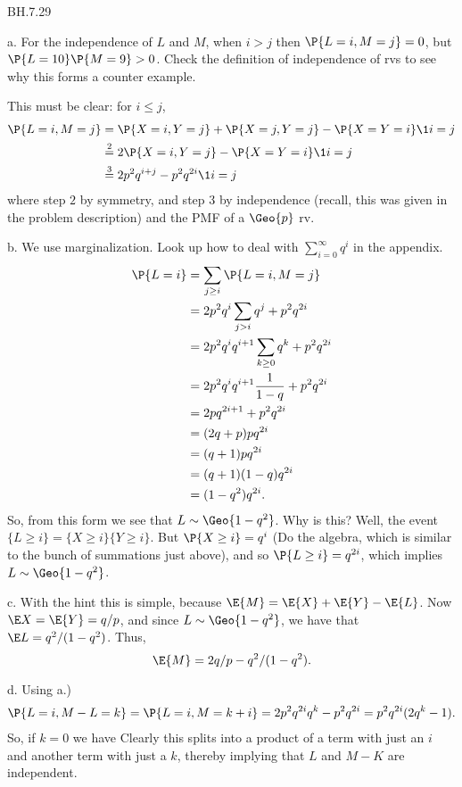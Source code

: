 
\setcounter{theorem}{28}
\begin{exercise} BH.7.29
\begin{solution}
a. For the independence of $L$ and $M$, when $i>j$ then $\P{L=i, M=j}=0$, but $\P{L=10}\P{M=9} > 0$. Check the definition of independence of rvs to see why this forms a counter example.

This must be clear: for $i\leq j$,
\begin{align*}
\P{L=i, M=j}
  &= \P{X=i, Y=j} + \P{X=j, Y=j} - \P{X=Y=i}\1{i=j}\\
  &\stackrel{2}{=} 2\P{X=i, Y=j} - \P{X=Y=i} \1{i=j} \\
  &\stackrel{3}{=} 2 p^{2} q^{i+j} - p^{2}q^{2i}\1{i=j}\\
\end{align*}
where step $2$ by symmetry, and step 3 by independence (recall, this was given in the problem description) and the PMF of a $\Geo{p}$ rv.

b. We use marginalization. Look up how to deal with $\sum_{i=0}^{\infty} q^{i}$ in the appendix.
\begin{align*}
  \P{L=i}
  &= \sum_{j\geq i} \P{L=i, M=j} \\
  &= 2p^2q^i\sum_{j> i} q^j + p^2q^{2i} \\
  &= 2p^2q^i q^{i+1}\sum_{k\geq 0} q^k + p^2q^{2i} \\
  &= 2p^2q^i q^{i+1}\frac{1}{1-q} + p^2q^{2i} \\
  &= 2p q^{2i+1} + p^2q^{2i} \\
  &= (2 q + p)pq^{2i} \\
  &= (q + 1)pq^{2i} \\
  &= (q + 1)(1-q)q^{2i} \\
  &= (1-q^{2})q^{2i}.
\end{align*}
So, from this form we see that $L\sim\Geo{1-q^{2}}$. Why is this? Well, the event $\{L\geq i\} = \{X\geq i\}\{Y\geq i\}$. But $\P{X\geq i} = q^{i}$ (Do the algebra, which is similar to the bunch of summations just above), and so $\P{L\geq i} = q^{2i}$, which implies $L\sim \Geo{1-q^{2}}$.

c. With the hint this is simple, because $\E{M} = \E{X}+\E{Y}- \E{L}$. Now $\E X = \E{Y} = q/p$, and since $L\sim \Geo{1-q^2}$, we have that $\E L = q^2/(1-q^{2})$. Thus,
\begin{equation*}
\E{M} = 2 q/ p - q^2/(1-q^2).
\end{equation*}

d. Using a.)
\begin{align*}
  \P{L=i, M-L=k} = \P{L=i, M=k+i} = 2p^2q^{2i} q^k - p^2q^{2i}=p^2q^{2i}(2q^k-1).
\end{align*}
So, if $k=0$ we have
Clearly this splits into a product of a term with just an $i$ and another term with just a $k$, thereby implying that $L$ and $M-K$ are independent.
\end{solution}



\end{exercise}

